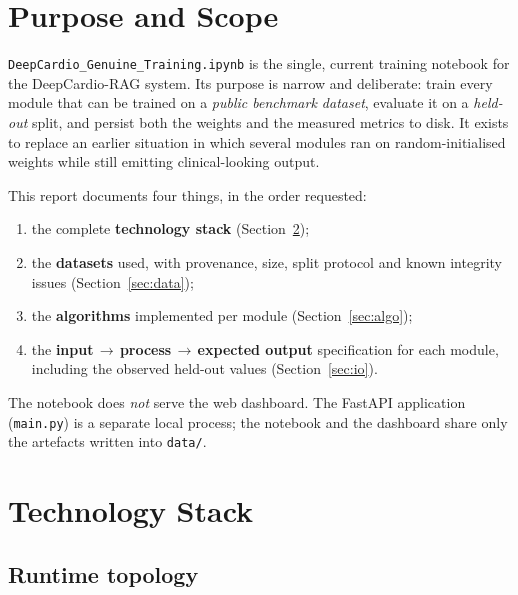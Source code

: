 \documentclass[11pt,a4paper]{article}
\newcommand{\code}[1]{\texttt{\small #1}}
\begin{document}
\section{Purpose and Scope}

\code{DeepCardio\_Genuine\_Training.ipynb} is the single, current training
notebook for the DeepCardio-RAG system. Its purpose is narrow and
deliberate: train every module that can be trained on a
\emph{public benchmark dataset}, evaluate it on a \emph{held-out} split,
and persist both the weights and the measured metrics to disk. It exists
to replace an earlier situation in which several modules ran on
random-initialised weights while still emitting clinical-looking output.

This report documents four things, in the order requested:

\begin{enumerate}[leftmargin=1.4em,itemsep=2pt]
  \item the complete \textbf{technology stack} (Section~\ref{sec:stack});
  \item the \textbf{datasets} used, with provenance, size, split protocol
        and known integrity issues (Section~\ref{sec:data});
  \item the \textbf{algorithms} implemented per module
        (Section~\ref{sec:algo});
  \item the \textbf{input\,$\rightarrow$\,process\,$\rightarrow$\,expected
        output} specification for each module, including the observed
        held-out values (Section~\ref{sec:io}).
\end{enumerate}

The notebook does \emph{not} serve the web dashboard. The FastAPI
application (\code{main.py}) is a separate local process; the notebook and
the dashboard share only the artefacts written into \code{data/}.

\section{Technology Stack}
\label{sec:stack}

\subsection{Runtime topology}
\end{document}
